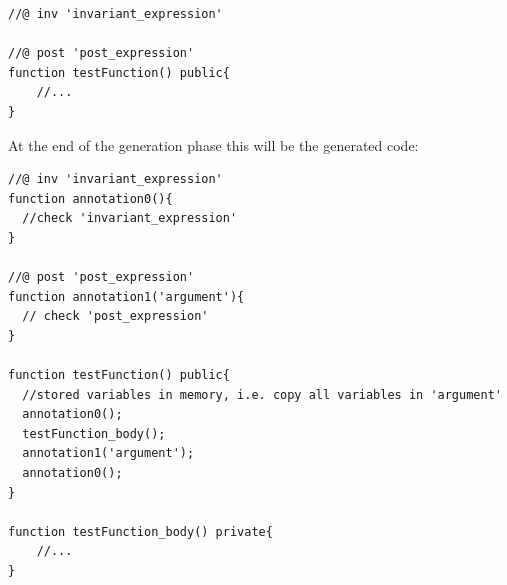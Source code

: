 \documentclass[a4paper]{article}
\begin{document}
\begin{lstlisting}[breaklines=true, language=Solidity ]
//@ inv 'invariant_expression'

//@ post 'post_expression'
function testFunction() public{
    //...
}
\end{lstlisting}
At the end of the generation phase this will be the generated code:
\begin{lstlisting}[breaklines=true, language=Solidity ]
//@ inv 'invariant_expression'
function annotation0(){
  //check 'invariant_expression'
}

//@ post 'post_expression'
function annotation1('argument'){
  // check 'post_expression'
}

function testFunction() public{
  //stored variables in memory, i.e. copy all variables in 'argument'
  annotation0();
  testFunction_body();
  annotation1('argument');
  annotation0();
}

function testFunction_body() private{
    //...
}
\end{lstlisting}
\end{document}
